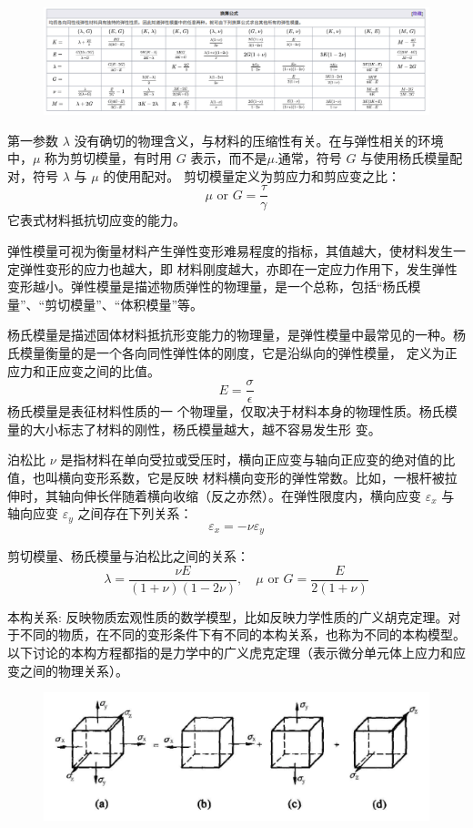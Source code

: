 \documentclass[12pt,a4paper]{article}
\begin{document}
\begin{figure}[H]
\centering
\includegraphics[scale=0.4]{./figures/19.png}
\caption{}
\end{figure}

第一参数 $\lambda$ 没有确切的物理含义，与材料的压缩性有关。在与弹性相关的环境中，$\mu$ 称为剪切模量，有时用 $G$ 表示，而不是$\mu$.通常，符号 $G$ 与使用杨氏模量配对，符号 $\lambda$ 与 $\mu$ 的使用配对。
剪切模量定义为剪应力和剪应变之比：
$$
\mu \text{ or } G = \frac{\tau}{\gamma}
$$ 
它表式材料抵抗切应变的能力。

弹性模量可视为衡量材料产生弹性变形难易程度的指标，其值越大，使材料发生一定弹性变形的应力也越大，即
材料刚度越大，亦即在一定应力作用下，发生弹性变形越小。弹性模量是描述物质弹性的物理量，是一个总称，包括“杨氏模量”、“剪切模量”、“体积模量”等。

杨氏模量是描述固体材料抵抗形变能力的物理量，是弹性模量中最常见的一种。杨氏模量衡量的是一个各向同性弹性体的刚度，它是沿纵向的弹性模量， 定义为正应力和正应变之间的比值。
$$
E = \frac{\sigma}{\epsilon}
$$
杨氏模量是表征材料性质的一
个物理量，仅取决于材料本身的物理性质。杨氏模量的大小标志了材料的刚性，杨氏模量越大，越不容易发生形
变。

泊松比 $\nu$ 是指材料在单向受拉或受压时，横向正应变与轴向正应变的绝对值的比值，也叫横向变形系数，它是反映
材料横向变形的弹性常数。比如，一根杆被拉伸时，其轴向伸长伴随着横向收缩（反之亦然）。在弹性限度内，横向应变 $\varepsilon_x$ 与轴向应变 $\varepsilon_y$ 之间存在下列关系：
$$
\varepsilon_x=-\nu\varepsilon_y
$$

剪切模量、杨氏模量与泊松比之间的关系：
$$
\lambda = \frac{\nu E}{(1 + \nu)(1 - 2\nu)},\quad \mu \text{ or } G= \frac{E}{2(1 + \nu)}
$$

本构关系: 反映物质宏观性质的数学模型，比如反映力学性质的广义胡克定理。对于不同的物质，在不同的变形条件下有不同的本构关系，也称为不同的本构模型。以下讨论的本构方程都指的是力学中的广义虎克定理（表示微分单元体上应力和应变之间的物理关系）。

\begin{figure}[H]
\centering
\includegraphics[scale=0.5]{./figures/16.png}
\caption{}
\end{figure}
\end{document}
